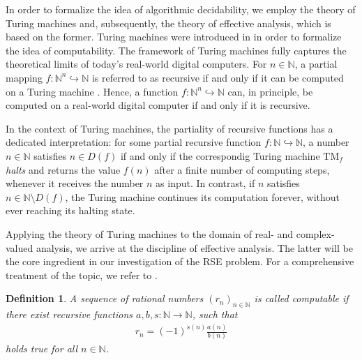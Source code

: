 \documentclass[conference]{IEEEtran}
\newcommand{\part}{\hookrightarrow}
\def\NN{{\mathbb N}}
\newcommand{\TM}{\mathrm{TM}}
\newtheorem{Definition}[Theorem]{Definition}
\begin{document}
	
	\noindent In order to formalize the idea of algorithmic decidability, we employ the theory of Turing machines and, subsequently, 
	the theory of effective analysis, which is based on the former.	Turing machines were introduced in \cite{T37a,T38} in order to formalize the idea of computability. 
	The framework of Turing machines fully captures the theoretical limits of today's real-world digital computers. For \(n\in\NN\), a partial mapping \(f : \NN^n \part \NN\) 
	is referred to as recursive if and only if it can be computed on a Turing machine \cite{Kl36,T37b}. Hence, a function \(f :\NN^n \part \NN\) can, in principle, be 
	computed on a real-world digital computer if and only if it is recursive. 
	
	In the context of Turing machines, the partiality of recursive functions has a dedicated interpretation: for some partial recursive function \(f: \NN \part \NN\), 
	a number \(n\in\NN\) satisfies \(n\in D(f)\) if and only if the correspondig Turing machine \(\TM_f\) \emph{halts} and returns the value \(f(n)\) after a finite
	number of computing steps, whenever it receives the number \(n\) as input. In contrast, if \(n\) satisfies \(n\in \NN\setminus D(f)\), the Turing machine continues
	its computation forever, without ever reaching its halting state. 

	Applying the theory of Turing machines to the domain of real- and complex-valued analysis, we arrive at the 
	discipline of effective analysis. The latter will be the core ingredient in our investigation of the RSE problem. 
	For a comprehensive treatment of the topic, we refer to \cite{PoRi17,AB14}.%

	\begin{Definition}  \label{ber}
						A sequence of rational numbers \((r_n)_{n\in\NN}\) is called computable if there exist recursive functions \(a,b,s:\NN\to\NN\), such that
						\begin{align*}   r_{n} = (-1)^{s(n)}\frac{a(n)}{b(n)} 
						\end{align*} 
						holds true for all \(n\in\NN\).
	\end{Definition}
\end{document}
